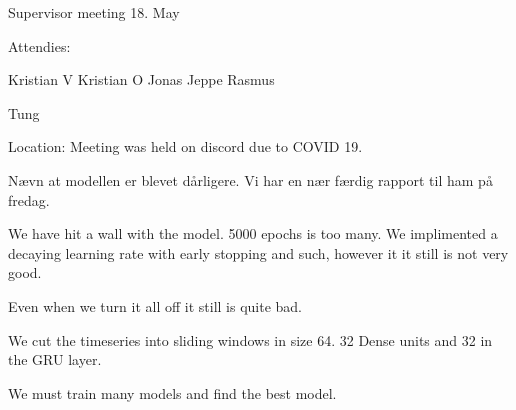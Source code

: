 Supervisor meeting 18. May

Attendies:

Kristian V
Kristian O
Jonas
Jeppe
Rasmus

Tung

Location: Meeting was held on discord due to COVID 19.


Nævn at modellen er blevet dårligere.
Vi har en nær færdig rapport til ham på fredag.

We have hit a wall with the model. 5000 epochs is too many.  We implimented a decaying learning rate with early stopping and such, however it it still is not very good.

Even when we turn it all off it still is quite bad.

We cut the timeseries into sliding windows in size 64. 32 Dense units and 32 in the GRU layer. 

We must train many models and find the best model.
